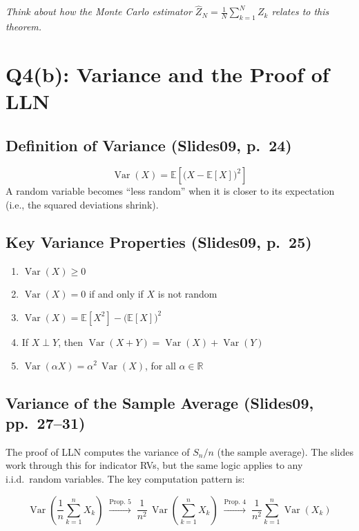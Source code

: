 \documentclass[11pt]{article}
\newcommand{\Var}{\operatorname{Var}}
\newcommand{\E}{\mathbb{E}}
\begin{document}
\bigskip
\noindent\textit{Think about how the Monte Carlo estimator $\hat{Z}_N = \frac{1}{N}\sum_{k=1}^N Z_k$ relates to this theorem.}

\section*{Q4(b): Variance and the Proof of LLN}

\subsection*{Definition of Variance (Slides09, p.\ 24)}

\[
\Var(X) = \E\!\left[\big(X - \E[X]\big)^2\right]
\]
A random variable becomes ``less random'' when it is closer to its expectation (i.e., the squared deviations shrink).

\subsection*{Key Variance Properties (Slides09, p.\ 25)}

\begin{tcolorbox}[colback=green!5, colframe=green!50!black, title=Variance Properties]
\begin{enumerate}[nosep]
    \item $\Var(X) \geq 0$
    \item $\Var(X) = 0$ if and only if $X$ is not random
    \item $\Var(X) = \E[X^2] - \big(\E[X]\big)^2$
    \item If $X \perp Y$, then $\Var(X + Y) = \Var(X) + \Var(Y)$
    \item $\Var(\alpha X) = \alpha^2\,\Var(X)$, for all $\alpha \in \mathbb{R}$
\end{enumerate}
\end{tcolorbox}

\subsection*{Variance of the Sample Average (Slides09, pp.\ 27--31)}

The proof of LLN computes the variance of $S_n/n$ (the sample average). The slides work through this for indicator RVs, but the same logic applies to any i.i.d.\ random variables. The key computation pattern is:

\[
\Var\!\left(\frac{1}{n}\sum_{k=1}^n X_k\right)
\;\xrightarrow{\text{Prop.\ 5}}\;
\frac{1}{n^2}\,\Var\!\left(\sum_{k=1}^n X_k\right)
\;\xrightarrow{\text{Prop.\ 4}}\;
\frac{1}{n^2}\sum_{k=1}^n \Var(X_k)
\]
\end{document}
